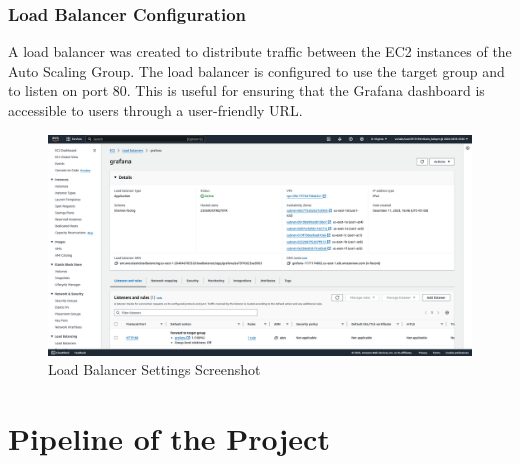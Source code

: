 \documentclass[12pt,oneside]{book} %
\begin{document}
\newpage
\subsubsection{Load Balancer Configuration}
A load balancer was created to distribute traffic between the EC2 instances of
the Auto Scaling Group. The load balancer is configured to use the target group
and to listen on port 80. This is useful for ensuring that the Grafana
dashboard is accessible to users through a user-friendly URL.
\begin{figure}[H]
    \centering
    \includegraphics[width=1\linewidth]{images/load-balancer.png}
    \caption{Load Balancer Settings Screenshot}\label{fig:load-balancer-settings}
\end{figure}

\newpage
\section{Pipeline of the Project}
\end{document}
